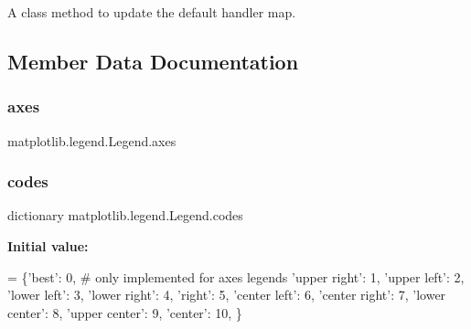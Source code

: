 \begin{DoxyVerb}A class method to update the default handler map.
\end{DoxyVerb}
 

\subsection{Member Data Documentation}
\mbox{\label{classmatplotlib_1_1legend_1_1Legend_a6d5b077598377c37b81678239f12a67a}} 
\subsubsection{\texorpdfstring{axes}{axes}}
{\footnotesize\ttfamily matplotlib.\+legend.\+Legend.\+axes}

\mbox{\label{classmatplotlib_1_1legend_1_1Legend_aeded78405dd0fd042071f872293ea488}} 
\subsubsection{\texorpdfstring{codes}{codes}}
{\footnotesize\ttfamily dictionary matplotlib.\+legend.\+Legend.\+codes\hspace{0.3cm}{\ttfamily [static]}}

{\bfseries Initial value\+:}
\begin{DoxyCode}
=  \{\textcolor{stringliteral}{'best'}:         0,  \textcolor{comment}{# only implemented for axes legends}
             \textcolor{stringliteral}{'upper right'}:  1,
             \textcolor{stringliteral}{'upper left'}:   2,
             \textcolor{stringliteral}{'lower left'}:   3,
             \textcolor{stringliteral}{'lower right'}:  4,
             \textcolor{stringliteral}{'right'}:        5,
             \textcolor{stringliteral}{'center left'}:  6,
             \textcolor{stringliteral}{'center right'}: 7,
             \textcolor{stringliteral}{'lower center'}: 8,
             \textcolor{stringliteral}{'upper center'}: 9,
             \textcolor{stringliteral}{'center'}:       10,
             \}
\end{DoxyCode}
\mbox{\label{classmatplotlib_1_1legend_1_1Legend_a880b57adba17c094f0b4a9aa3fc363e4}} 
